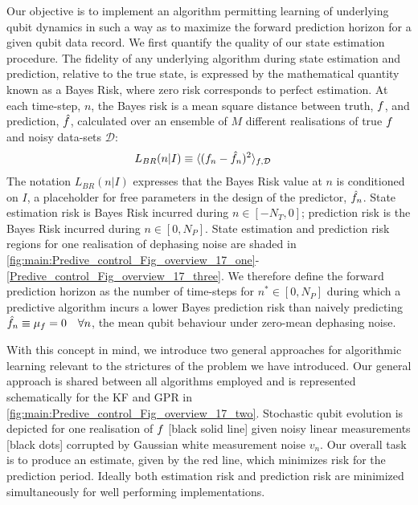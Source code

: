 Our objective is to implement an algorithm permitting learning of underlying qubit dynamics in such a way as to maximize the forward prediction horizon for a given qubit data record.  We first quantify the quality of our state estimation procedure.  The fidelity of any underlying algorithm during state estimation and prediction, relative to the true state, is expressed by the mathematical quantity known as a Bayes Risk, where zero risk corresponds to perfect estimation. At each time-step, $n$, the Bayes risk is a mean square distance between truth, $f$, and prediction, $\hat{f}$, calculated over an ensemble of $M$ different realisations of true $f$ and noisy data-sets $\mathcal{D}$:
\begin{align}
L_{BR}(n | I) & \equiv \langle(f_n - \hat{f}_n)^2 \rangle_{f,\mathcal{D}} \label{eqn:main:sec:ap_opt_LossBR}
\end{align}
The notation $L_{BR}(n | I)$ expresses that the Bayes Risk value at $n$ is conditioned on $I$, a placeholder for free parameters in the design of the predictor, $\hat{f}_n$. State estimation risk is Bayes Risk incurred during $n \in [-N_T, 0]$; prediction risk is the Bayes Risk incurred during $n \in [0, N_P]$. State estimation and prediction risk regions for one realisation of dephasing noise are shaded in \cref{fig:main:Predive_control_Fig_overview_17_one}-\ref{Predive_control_Fig_overview_17_three}.  We therefore define the forward prediction horizon as the number of time-steps for $ n^{*} \in [0, N_P]$ during which a predictive algorithm incurs a lower Bayes prediction risk than naively predicting $\hat{f}_n \equiv \mu_f = 0 \quad \forall n$, the mean qubit behaviour under zero-mean dephasing noise. 

With this concept in mind, we introduce two general approaches for algorithmic learning relevant to the strictures of the problem we have introduced.  Our general approach is shared between all algorithms employed and is represented schematically for the KF and GPR in \cref{fig:main:Predive_control_Fig_overview_17_two}. Stochastic qubit evolution is depicted for one realisation of $f$ [black solid line] given noisy linear measurements [black dots] corrupted by Gaussian white measurement noise $v_n$.  Our overall task is to produce an estimate, given by the red line, which minimizes risk for the prediction period.  Ideally both estimation risk and prediction risk are minimized simultaneously for well performing implementations.

